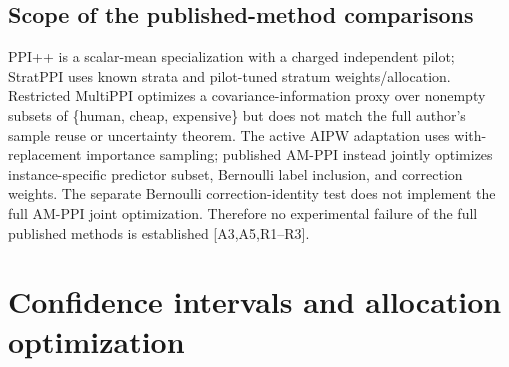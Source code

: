 \documentclass[11pt,a4paper]{article}
\begin{document}
\subsection{Scope of the published-method comparisons}
PPI++ is a scalar-mean specialization with a charged independent pilot; StratPPI uses known strata and pilot-tuned stratum weights/allocation. Restricted MultiPPI optimizes a covariance-information proxy over nonempty subsets of \{human, cheap, expensive\} but does not match the full author's sample reuse or uncertainty theorem. The active AIPW adaptation uses with-replacement importance sampling; published AM-PPI instead jointly optimizes instance-specific predictor subset, Bernoulli label inclusion, and correction weights. The separate Bernoulli correction-identity test does not implement the full AM-PPI joint optimization. Therefore no experimental failure of the full published methods is established [A3,A5,R1--R3].

\section{Confidence intervals and allocation optimization}
\end{document}
